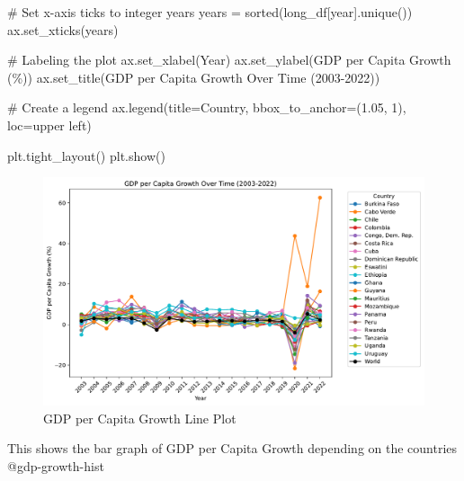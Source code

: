 \documentclass[
  letterpaper,
  DIV=11,
  numbers=noendperiod]{scrartcl}
\newenvironment{Shaded}{\begin{snugshade}}{\end{snugshade}}
\newcommand{\BuiltInTok}[1]{\textcolor[rgb]{0.00,0.23,0.31}{#1}}
\newcommand{\CommentTok}[1]{\textcolor[rgb]{0.37,0.37,0.37}{#1}}
\newcommand{\DecValTok}[1]{\textcolor[rgb]{0.68,0.00,0.00}{#1}}
\newcommand{\FloatTok}[1]{\textcolor[rgb]{0.68,0.00,0.00}{#1}}
\newcommand{\NormalTok}[1]{\textcolor[rgb]{0.00,0.23,0.31}{#1}}
\newcommand{\OperatorTok}[1]{\textcolor[rgb]{0.37,0.37,0.37}{#1}}
\newcommand{\StringTok}[1]{\textcolor[rgb]{0.13,0.47,0.30}{#1}}
\begin{document}
\begin{Shaded}
\begin{Highlighting}[]
\CommentTok{\# Set x{-}axis ticks to integer years}
\NormalTok{years }\OperatorTok{=} \BuiltInTok{sorted}\NormalTok{(long\_df[}\StringTok{\textquotesingle{}year\textquotesingle{}}\NormalTok{].unique())}
\NormalTok{ax.set\_xticks(years)}

\CommentTok{\# Labeling the plot}
\NormalTok{ax.set\_xlabel(}\StringTok{\textquotesingle{}Year\textquotesingle{}}\NormalTok{)}
\NormalTok{ax.set\_ylabel(}\StringTok{\textquotesingle{}GDP per Capita Growth (\%)\textquotesingle{}}\NormalTok{)}
\NormalTok{ax.set\_title(}\StringTok{\textquotesingle{}GDP per Capita Growth Over Time (2003{-}2022)\textquotesingle{}}\NormalTok{)}

\CommentTok{\# Create a legend}
\NormalTok{ax.legend(title}\OperatorTok{=}\StringTok{\textquotesingle{}Country\textquotesingle{}}\NormalTok{, bbox\_to\_anchor}\OperatorTok{=}\NormalTok{(}\FloatTok{1.05}\NormalTok{, }\DecValTok{1}\NormalTok{), loc}\OperatorTok{=}\StringTok{\textquotesingle{}upper left\textquotesingle{}}\NormalTok{)}

\NormalTok{plt.tight\_layout()}
\NormalTok{plt.show()}
\end{Highlighting}
\end{Shaded}

\begin{figure}[H]

{\centering \includegraphics{report_files/figure-pdf/gdp-growth-line-output-1.pdf}

}

\caption{GDP per Capita Growth Line Plot}

\end{figure}%

This shows the bar graph of GDP per Capita Growth depending on the
countries @gdp-growth-hist
\end{document}
